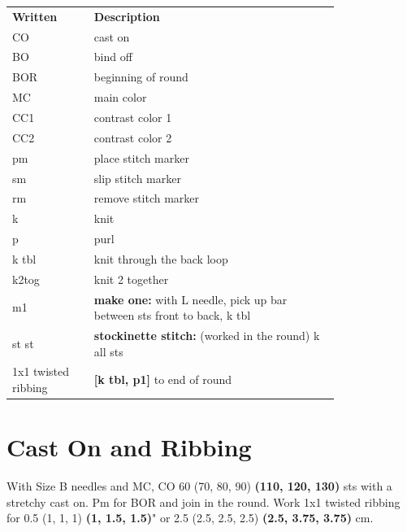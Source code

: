 \documentclass[12pt]{article}
\renewcommand{\arraystretch}{2} %
\renewcommand{\repeat}[1]{\textbf{[#1]}} %
\begin{document}
\begin{multicols}{2}
\begin{center}
{\renewcommand{\arraystretch}{1.2}
\begin{tabular}{| C{0.2\linewidth}  p{0.6\linewidth} | }
\thickhline {} 
\textbf{Written}	& \textbf{Description} \\ \thickhline
CO	& cast on \\
BO 	& bind off \\
BOR 	& beginning of round \\
MC 	& main color \\
CC1 	& contrast color 1 \\
CC2 	& contrast color 2 \\
pm	& place stitch marker \\
sm	& slip stitch marker \\
rm 	& remove stitch marker \\
k	& knit \\
p	& purl   \\
k tbl	& knit through the back loop \\
k2tog 	& knit 2 together \\
m1	& \textbf{make one:} with L needle, pick up bar between sts front to back, k tbl \\
st st 	& \textbf{stockinette stitch:} (worked in the round) k all sts \\
1x1 twisted ribbing 	& \repeat{k tbl, p1} to end of round \\
\hline
\end{tabular}
}
\end{center}
\normalsize

\section*{Cast On and Ribbing}

With Size B needles and MC, CO 60 (70, 80, 90) \textbf{(110, 120, 130)} sts with a stretchy cast on. Pm for BOR and join in the round. Work 1x1 twisted ribbing for 0.5 (1, 1, 1) \textbf{(1, 1.5, 1.5)}" or 2.5 (2.5, 2.5, 2.5) \textbf{(2.5, 3.75, 3.75)} cm.


\end{multicols}
\end{document}
